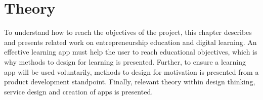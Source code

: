 \chapter{Theory}\label{cha:Theory} %

 To understand how to reach the objectives of the project, this chapter describes and presents related work on entrepreneurship education and digital learning. An effective learning app must help the user to reach educational objectives, which is why methods to design for learning is presented. Further, to ensure a learning app will be used voluntarily, methods to design for motivation is presented from a product development standpoint. Finally, relevant theory within design thinking, service design and creation of apps is presented.





 

 

  

  

  

  

  
